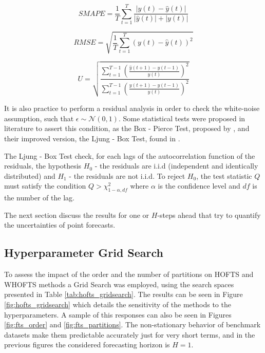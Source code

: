 \begin{equation}
SMAPE = \frac{1}{T} \sum_{t=1}^T  \frac{|y(t) - \hat{y}(t)|}{|\hat{y}(t)| +  |y(t)|} 
\label{eqn:smape}
\end{equation}

\begin{equation}
RMSE = \sqrt{\frac{1}{T}\sum_{t=1}^T (y(t) - \hat{y}(t))^2}
\label{eqn:rmse}
\end{equation}

\begin{equation}
U = \sqrt{\frac{\sum_{t=1}^{T-1} \left( \frac{\hat{y}(t+1)-y(t-1)}{y(t)} \right)^2}{\sum_{t=1}^{T-1} \left( \frac{y(t+1)-y(t-1)}{y(t)} \right)^2}}
\label{eqn:theilu}
\end{equation}
  
It is also practice to perform a residual analysis in order to check the white-noise  assumption, such that $\epsilon \sim \mathcal{N}(0,1)$. Some statistical tests were proposed in literature to assert this condition, as the  Box - Pierce Test, proposed by \cite{Box1970DistributionModels}, and their improved version, the Ljung - Box Test, found in \cite{Ljung1978OnModels}.

The Ljung - Box Test check, for each lags of the autocorrelation function of the residuals, the hypothesis $H_0$ - the residuals are i.i.d (independent and identically distributed) and $H_1$ - the residuals are not i.i.d. To reject $H_0$, the test statistic $Q$ must satisfy the condition $Q > \chi^2_{1-\alpha,df}$ where $\alpha$ is the confidence level and $df$ is the number of the lag. 


The next section discuss the results for one or $H$-steps ahead that try to quantify the uncertainties of point forecasts.

\subsection{Hyperparameter Grid Search}
\label{sec:fts_gridsearch}

To assess the impact of the order and the number of partitions on HOFTS and WHOFTS methods a Grid Search was employed, using the search spaces presented in Table \ref{tab:hofts_gridsearch}. The results can be seen in Figure \ref{fig:hofts_gridsearch} which details the sensitivity of the methods to the hyperparameters. A sample of this responses can also be seen in Figures \ref{fig:fts_order} and \ref{fig:fts_partitions}. The non-stationary behavior of benchmark datasets make them predictable accurately just for very short terms, and in the previous figures the considered forecasting horizon is $H=1$.

